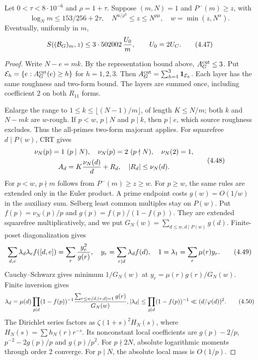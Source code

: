 \begin{lemma}
Let $0<\tau<8\cdot10^{-6}$ and $\rho=1+\tau$.
Suppose $(m,N)=1$ and $P^-(m)\ge z$, with
\[
 \log_Nm\le153/256+2\tau,\quad
 N^{u/\rho^3}\le z\le N^{\rho\mu},\quad w=\min(z,N^\alpha).
 \tag{4.46}
\]
Eventually, uniformly in $m$,
\[
 S((\mathcal B_G)_m,z)\le3\cdot502002\,{U_0\over m},
 \qquad U_0=2U_C.
 \tag{4.47}
\]
\end{lemma}
\begin{proof}
Write $N-e=mk$.
By the representation bound above, $A_G^{\rm cut}\le3$.
Put $\mathcal E_h=\{e:A_G^{\rm cut}(e)\ge h\}$ for $h=1,2,3$.
Then $A_G^{\rm cut}=\sum_{h=1}^3\mathbf1_{\mathcal E_h}$.
Each layer has the same roughness and two-form bound.
The layers are summed once, including coefficient 2 on both $R_{11}$ forms.

Enlarge the range to $1\le k\le\lfloor(N-1)/m\rfloor$, of length $K\le N/m$;
both $k$ and $N-mk$ are $w$-rough.
If $p<w$, $p\mid N$ and $p\mid k$, then $p\mid e$, which source roughness excludes.
Thus the all-primes two-form majorant applies.
For squarefree $d\mid P(w)$, CRT gives
\[
\begin{gathered}
 \nu_N(p)=1\ (p\mid N),\quad \nu_N(p)=2\ (p\nmid N),
 \quad \nu_N(2)=1,\\
 A_d=K{\nu_N(d)\over d}+R_d,\quad |R_d|\le\nu_N(d).
\end{gathered}
 \tag{4.48}
\]
For $p<w$, $p\nmid m$ follows from $P^-(m)\ge z\ge w$.
For $p\ge w$, the same rules are extended only in the Euler product.
A prime endpoint costs $g(w)=O(1/w)$ in the auxiliary sum.
Selberg least common multiples stay on $P(w)$.
Put $f(p)=\nu_N(p)/p$ and $g(p)=f(p)/(1-f(p))$.
They are extended squarefree multiplicatively, and we put
$G_N(w)=\sum_{d\le w,d\mid P(w)}g(d)$.
Finite-poset diagonalization gives
\[
 \sum_{d,e}\lambda_d\lambda_ef([d,e])
 =\sum_r{y_r^2\over g(r)},\quad
 y_r=\sum_{r\mid d}\lambda_df(d),\quad
 1=\lambda_1=\sum_r\mu(r)y_r.
 \tag{4.49}
\]
Cauchy--Schwarz gives minimum $1/G_N(w)$ at $y_r=\mu(r)g(r)/G_N(w)$.
Finite inversion gives
\[
 \lambda_d=\mu(d)\prod_{p\mid d}(1-f(p))^{-1}
     {\sum_{r\le w/d,(r,d)=1}g(r)\over G_N(w)},\\
 |\lambda_d|\le\prod_{p\mid d}(1-f(p))^{-1}
              \ll(d/\varphi(d))^2.
 \tag{4.50}
\]
The Dirichlet series factors as $\zeta(1+s)^2H_N(s)$,
where $H_N(s)=\sum h_N(r)r^{-s}$.
Its nonconstant local coefficients are
$g(p)-2/p$, $p^{-2}-2g(p)/p$ and $g(p)/p^2$.
For $p\nmid2N$, absolute logarithmic moments through order 2 converge.
For $p\mid N$, the absolute local mass is $O(1/p)$.

\end{proof}
